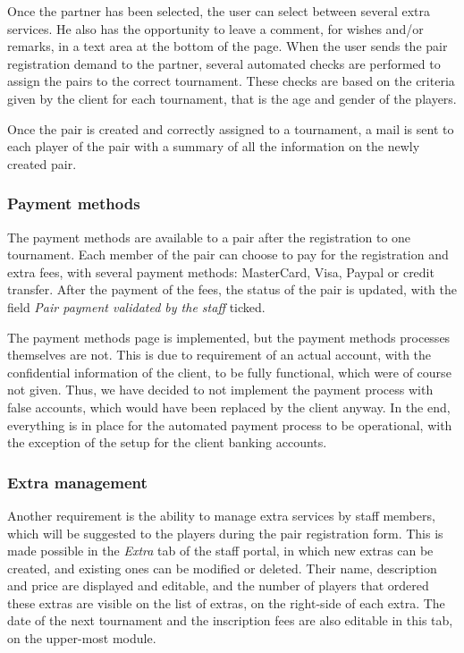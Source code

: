 Once the partner has been selected, the user can select between several extra
services. He also has the opportunity to leave a comment, for wishes and/or
remarks, in a text area at the bottom of the page. When the user sends the
pair registration demand to the partner, several automated checks are performed
to assign the pairs to the correct tournament. These checks are based
on the criteria given by the client for each tournament, that is the age and
gender of the players. \newline

Once the pair is created and correctly assigned to a tournament, a mail
is sent to each player of the pair with a summary of all the information on the
newly created pair.

\subsubsection{Payment methods}
\label{subs:Payment methods}


The payment methods are available to a pair after the registration to one
tournament. Each member of the pair can choose to pay for the registration and
extra fees, with several payment methods: MasterCard, Visa, Paypal or credit
transfer. After the payment of the fees, the status of the pair is updated,
with the field \textit{Pair payment validated by the staff} ticked.\newline

The payment methods page is implemented, but the payment methods processes
themselves are not. This is due to requirement of an actual account,
with the confidential information of the client, to be fully functional,
which were of course not given. Thus, we have decided to not implement
the payment process with false accounts, which would have been replaced
by the client anyway. In the end, everything is in place for the automated
payment process to be operational, with the exception of the setup for the
client banking accounts.

\subsubsection{Extra management}
\label{subs:Extra management}


Another requirement is the ability to manage extra services by staff members,
which will be suggested to the players during the pair registration form.
This is made possible in the \textit{Extra} tab of the staff portal, in which
new extras can be created, and existing ones can be modified or deleted.
Their name, description and price are displayed and editable,
and the number of players that ordered these extras are visible on the list
of extras, on the right-side of each extra. The date of the next tournament
and the inscription fees are also editable in this tab,
on the upper-most module.

